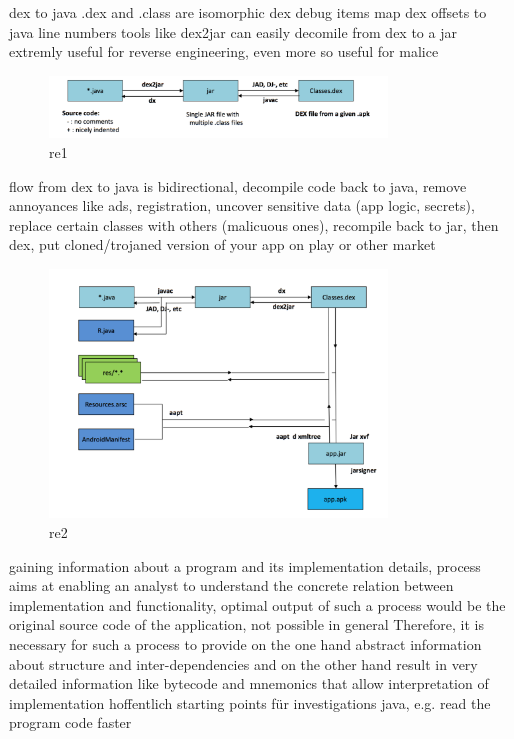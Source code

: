 %
dex to java
.dex and .class are isomorphic
dex debug items map dex offsets to java line numbers
tools like dex2jar can easily decomile from dex to a jar
extremly useful for reverse engineering, even more so useful for malice\newline
\begin{figure}[h]
    \centering
    \includegraphics[width=0.8\textwidth]{data/re1.png}
    \caption{re1}
    \label{fig:re1}
\end{figure}
flow from dex to java is bidirectional, decompile code back to java, remove annoyances like ads, registration, uncover sensitive data (app logic, secrets), replace certain classes with others (malicuous ones), recompile back to jar, then dex, put cloned/trojaned version of your app on play or other market\newline
\begin{figure}[h]
    \centering
    \includegraphics[width=0.8\textwidth]{data/re2.png}
    \caption{re2}
    \label{fig:re2}
\end{figure}
\cite{andevconDalvikART}
%


gaining information about a program and its implementation
details, process aims at enabling an analyst to understand the concrete
relation between implementation and functionality, optimal output
of such a process would be the original source code of the application, not possible in general\newline
Therefore, it is necessary for such a process to provide on the one hand abstract information about structure and inter-dependencies and on the other hand result in very detailed information like bytecode and mnemonics that allow interpretation of implementation\newline
hoffentlich starting points für investigations\newline
java, e.g. read the program code faster\newline


